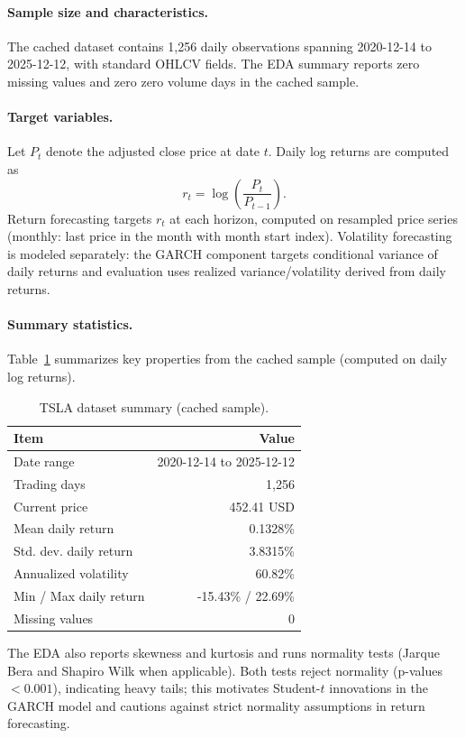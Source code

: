 \documentclass[11pt,a4paper]{article}
\begin{document}
\paragraph{Sample size and characteristics.}
The cached dataset contains 1,256 daily observations spanning 2020-12-14 to 2025-12-12, with standard OHLCV fields. The EDA summary reports zero missing values and zero zero volume days in the cached sample.

\paragraph{Target variables.}
Let $P_t$ denote the adjusted close price at date $t$. Daily log returns are computed as
\begin{equation}
\label{eq:logret}
 r_t = \log\left(\frac{P_t}{P_{t-1}}\right).
\end{equation}
Return forecasting targets $r_t$ at each horizon, computed on resampled price series (monthly: last price in the month with month start index). Volatility forecasting is modeled separately: the GARCH component targets conditional variance of daily returns and evaluation uses realized variance/volatility derived from daily returns.

\paragraph{Summary statistics.}
Table~\ref{tab:data-summary} summarizes key properties from the cached sample (computed on daily log returns).

\begin{table}[H]
\centering
\caption{TSLA dataset summary (cached sample).}
\label{tab:data-summary}
\begin{tabular}{l r}
\toprule
Item & Value \\
\midrule
Date range & 2020-12-14 to 2025-12-12 \\
Trading days & 1,256 \\
Current price & 452.41 USD \\
Mean daily return & 0.1328\% \\
Std. dev. daily return & 3.8315\% \\
Annualized volatility & 60.82\% \\
Min / Max daily return & -15.43\% / 22.69\% \\
Missing values & 0 \\
\bottomrule
\end{tabular}
\end{table}
\noindent The EDA also reports skewness and kurtosis and runs normality tests (Jarque Bera and Shapiro Wilk when applicable). Both tests reject normality (p-values $< 0.001$), indicating heavy tails; this motivates Student-$t$ innovations in the GARCH model and cautions against strict normality assumptions in return forecasting.
\end{document}
